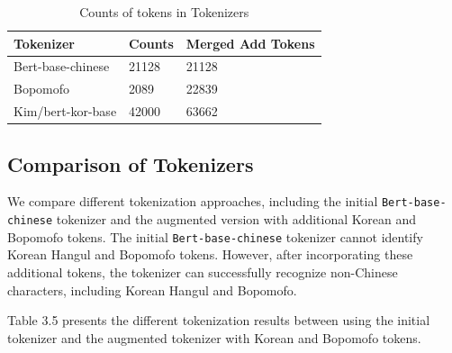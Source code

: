 \documentclass[PhD]{PHlab-thesis}
\begin{document}
\begin{table}
\begin{tabularx}{0.9\linewidth}{p{4cm} p{4cm} p{4cm}}
Tokenizer
& Counts
& Merged Add Tokens
\\
\toprule
Bert-base-chinese
& 21128
& 21128
\\
Bopomofo
&  2089
& 22839\\
Kim/bert-kor-base
& 42000
& 63662\\
\bottomrule
\end{tabularx}
\caption{Counts of tokens in Tokenizers}
\label{tab:notation}
\end{table}

\subsection{Comparison of Tokenizers}
We compare different tokenization approaches, including the initial \texttt{Bert-base-chinese} tokenizer and the augmented version with additional Korean and Bopomofo tokens. The initial \texttt{Bert-base-chinese} tokenizer cannot identify Korean Hangul and Bopomofo tokens. However, after incorporating these additional tokens, the tokenizer can successfully recognize non-Chinese characters, including Korean Hangul and Bopomofo.

Table 3.5 presents the different tokenization results between using the initial tokenizer and the augmented tokenizer with Korean and Bopomofo tokens.

\end{document}
